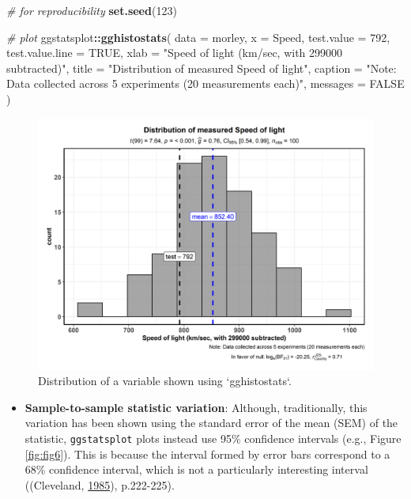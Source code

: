 \documentclass[
]{article}
\newenvironment{Shaded}{\begin{snugshade}}{\end{snugshade}}
\newcommand{\CommentTok}[1]{\textcolor[rgb]{0.56,0.35,0.01}{\textit{#1}}}
\newcommand{\DataTypeTok}[1]{\textcolor[rgb]{0.13,0.29,0.53}{#1}}
\newcommand{\DecValTok}[1]{\textcolor[rgb]{0.00,0.00,0.81}{#1}}
\newcommand{\KeywordTok}[1]{\textcolor[rgb]{0.13,0.29,0.53}{\textbf{#1}}}
\newcommand{\NormalTok}[1]{#1}
\newcommand{\OperatorTok}[1]{\textcolor[rgb]{0.81,0.36,0.00}{\textbf{#1}}}
\newcommand{\OtherTok}[1]{\textcolor[rgb]{0.56,0.35,0.01}{#1}}
\newcommand{\StringTok}[1]{\textcolor[rgb]{0.31,0.60,0.02}{#1}}
\providecommand{\tightlist}{%
  \setlength{\itemsep}{0pt}\setlength{\parskip}{0pt}}
\begin{document}
\begin{Shaded}
\begin{Highlighting}[]
\CommentTok{\# for reproducibility}
\KeywordTok{set.seed}\NormalTok{(}\DecValTok{123}\NormalTok{)}

\CommentTok{\# plot}
\NormalTok{ggstatsplot}\OperatorTok{::}\KeywordTok{gghistostats}\NormalTok{(}
  \DataTypeTok{data =}\NormalTok{ morley,}
  \DataTypeTok{x =}\NormalTok{ Speed,}
  \DataTypeTok{test.value =} \DecValTok{792}\NormalTok{,}
  \DataTypeTok{test.value.line =} \OtherTok{TRUE}\NormalTok{,}
  \DataTypeTok{xlab =} \StringTok{"Speed of light (km/sec, with 299000 subtracted)"}\NormalTok{,}
  \DataTypeTok{title =} \StringTok{"Distribution of measured Speed of light"}\NormalTok{,}
  \DataTypeTok{caption =} \StringTok{"Note: Data collected across 5 experiments (20 measurements each)"}\NormalTok{,}
  \DataTypeTok{messages =} \OtherTok{FALSE}
\NormalTok{)}
\end{Highlighting}
\end{Shaded}

\begin{figure}[H]
\includegraphics[width=1\linewidth]{./figures/paper-fig5-1} \caption{Distribution of a variable shown using `gghistostats`.}\label{fig:fig5}
\end{figure}

\begin{itemize}
\tightlist
\item
  \textbf{Sample-to-sample statistic variation}: Although, traditionally, this
  variation has been shown using the standard error of the mean (SEM) of the
  statistic, \texttt{ggstatsplot} plots instead use 95\% confidence intervals (e.g.,
  Figure \ref{fig:fig6}). This is because the interval formed by error bars
  correspond to a 68\% confidence interval, which is not a particularly
  interesting interval ((Cleveland, \protect\hyperlink{ref-clevelandElementsGraphingData1985}{1985}), p.222-225).
\end{itemize}
\end{document}
